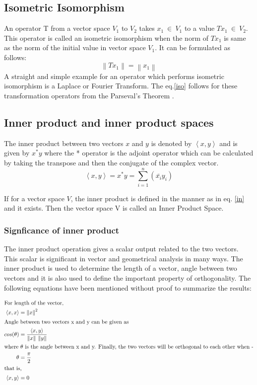 \documentclass[a4paper,12pt]{article}
\newcommand\norm[1]{\left\lVert#1\right\rVert}
\begin{document}
	\subsection{Isometric Isomorphism}
	An operator T from a vector space $V_{1}$ to $V_{2}$ takes $x_{1} \:\in\: V_{1}$ to a value $Tx_{1} \:\in \:V_{2}$. This operator is called an isometric isomorphism when the norm of $Tx_{1}$ is same as the norm of the initial value in vector space $V_{1}$. It can be formulated as follows:
		\begin{equation}
			\norm{Tx_{1}} = \norm{x_{1}}
			\label{iso}
		\end{equation}
	A straight and simple example for an operator which performs isometric isomorphism is a Laplace or Fourier Transform. The eq.\ref{iso} follows for these transformation operators from the Parseval's Theorem \cite{parseval}.
	\subsection{Inner product and inner product spaces} The inner product between two vectors $x$ and $y$ is denoted by $\left\langle x, y \right\rangle$ and is given by $x^{*}y$ where the * operator is the adjoint operator which can be calculated by taking the transpose and then the conjugate of the complex vector.
		\begin{equation}
			\left\langle x, y \right\rangle = x^{*}y = \sum\limits_{i=1}^n (\bar{x_{i}}y_{i})
			\label{in}
		\end{equation}
		
		If for a vector space $V$, the inner product is defined in the manner as in eq. \ref{in} and it exists. Then the vector space V is called an Inner Product Space.
		\subsubsection{Signficance of inner product}
			The inner product operation gives a scalar output related to the two vectors. This scalar is significant in vector and geometrical analysis in many ways. The inner product is used to determine the length of a vector, angle between two vectors and it is also used to define the important property of orthogonality. The following equations have been mentioned without proof to summarize the results:
			
			\begin{align}
				\intertext{For length of the vector,}
				\left\langle x, x \right\rangle &= \norm{x}^{2} \\
				\intertext{Angle between two vectors x and y can be given as}
				cos(\theta)&= \frac{\left\langle x, y \right\rangle}{\norm{x} \: \norm{y}} \\
				\intertext{where $\theta$ is the angle between x and y. Finally, the two vectors will be orthogonal to each other when -}
				\theta &= \frac{\pi}{2} \\
				\intertext{that is, }
				\left\langle x, y \right\rangle &= 0 
			\end{align}
			
\end{document}
